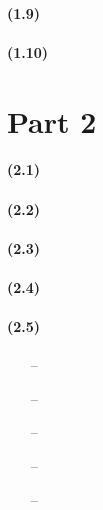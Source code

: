 \documentclass[10pt,letter]{article}
\begin{document}
\paragraph{(1.9)}
\paragraph{(1.10)}

\section*{Part 2}
\paragraph{(2.1)}
\paragraph{(2.2)}
\paragraph{(2.3)}
\paragraph{(2.4)}
\paragraph{(2.5)}
\begin{itemize}
\item[--]
\item[--]
\item[--]
\item[--]
\item[--]
\end{itemize}
\end{document}
